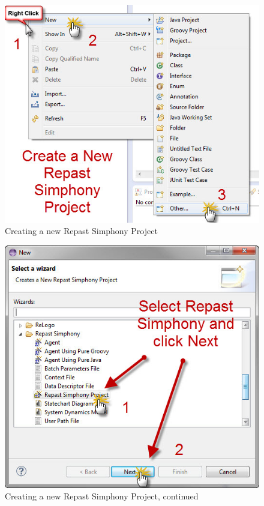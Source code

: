 \documentclass[11pt]{amsart}
\begin{document}
\begin{figure}[ht]
\begin{center}
\vspace{.2in}
\centerline {
\includegraphics[totalheight=0.35\textheight]{images/002.jpg}
}
\caption{Creating a new Repast Simphony Project}
\label{fig:002}
\end{center}
\end{figure}




\begin{figure}[ht]
\begin{center}
\vspace{.2in}
\centerline {
\includegraphics[totalheight=0.35\textheight]{images/003.jpg}
}
\caption{Creating a new Repast Simphony Project, continued}
\label{fig:003}
\end{center}
\end{figure}
\end{document}
